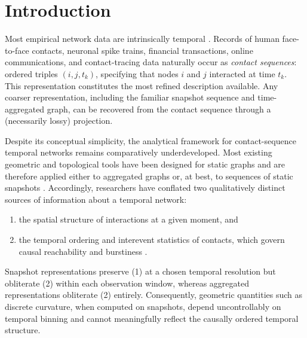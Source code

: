 \documentclass[
    pre,
    twocolumn,
    superscriptaddress,
    showpacs,
    nofootinbib,
    amsmath,
    amssymb,
    floatfix
]{revtex4-2}
\theoremstyle{plain} %
\theoremstyle{definition} %
\begin{document}
\section{Introduction}\label{sec:intro}

Most empirical network data are intrinsically temporal \cite{Holme2012,Masuda2016}. Records of human face-to-face contacts, neuronal spike trains, financial transactions, online communications, and contact-tracing data naturally occur as \emph{contact sequences}: ordered triples $(i,j,t_k)$, specifying that nodes $i$ and $j$ interacted at time $t_k$.  This representation constitutes the most refined description available. Any coarser representation, including the familiar snapshot sequence and time-aggregated graph, can be recovered from the contact sequence through a (necessarily lossy) projection.

Despite its conceptual simplicity, the analytical framework for contact-sequence temporal networks remains comparatively underdeveloped. Most existing geometric and topological tools have been designed for static graphs and are therefore applied either to aggregated graphs or, at best, to sequences of static snapshots \cite{Krings2012,Ribeiro2013,Scholtes2014}. Accordingly, researchers have conflated two qualitatively distinct sources of information about a temporal network: 
\begin{enumerate} 
    \item the spatial structure of interactions at a given moment, and 
    \item the temporal ordering and interevent statistics of contacts, which govern causal reachability and burstiness \cite{Karsai2011,Lambiotte2013}.
\end{enumerate} 
Snapshot representations preserve (1) at a chosen temporal resolution but obliterate (2) within each observation window, whereas aggregated representations obliterate (2) entirely. Consequently, geometric quantities such as discrete curvature, when computed on snapshots, depend uncontrollably on temporal binning and cannot meaningfully reflect the causally ordered temporal structure.
\end{document}
